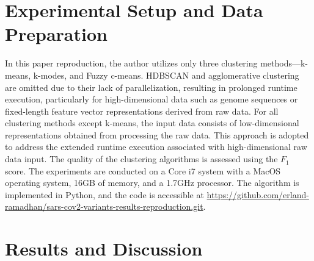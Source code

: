 \documentclass[%
 aip,
 jmp,%
 amsmath,amssymb,
 reprint,%
]{revtex4-2}
\begin{document}
\section{Experimental Setup and Data Preparation}
In this paper reproduction, the author utilizes only three clustering methods—k-means, k-modes, and Fuzzy c-means.
HDBSCAN and agglomerative clustering are omitted due to their lack of parallelization, resulting in prolonged runtime
execution, particularly for high-dimensional data such as genome sequences or fixed-length feature vector representations
derived from raw data. For all clustering methods except k-means, the input data consists of low-dimensional
representations obtained from processing the raw data. This approach is adopted to address the extended runtime
execution associated with high-dimensional raw data input. The quality of the clustering algorithms is assessed using
the $F_1$ score. The experiments are conducted on a Core i7 system with a MacOS operating system, 16GB of memory, and a
1.7GHz processor. The algorithm is implemented in Python, and the code is accessible at
\url{https://github.com/erland-ramadhan/sars-cov2-variants-results-reproduction.git}.

\section{Results and Discussion}
\end{document}
